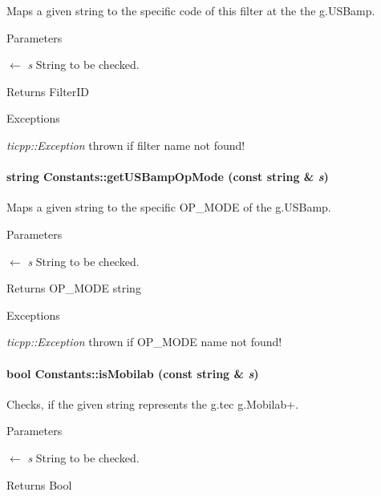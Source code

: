 Maps a given string to the specific code of this filter at the the g.USBamp. 
\begin{DoxyParams}{Parameters}
\item[\mbox{$\leftarrow$} {\em s}]String to be checked. \end{DoxyParams}
\begin{DoxyReturn}{Returns}
FilterID 
\end{DoxyReturn}

\begin{DoxyExceptions}{Exceptions}
\item[{\em ticpp::Exception}]thrown if filter name not found! \end{DoxyExceptions}
\hypertarget{class_constants_a33789e205b2169ce7787859db523b0d2}{
\paragraph[{getUSBampOpMode}]{\setlength{\rightskip}{0pt plus 5cm}string Constants::getUSBampOpMode (const string \& {\em s})}\hfill}
\label{class_constants_a33789e205b2169ce7787859db523b0d2}


Maps a given string to the specific OP\_\-MODE of the g.USBamp. 
\begin{DoxyParams}{Parameters}
\item[\mbox{$\leftarrow$} {\em s}]String to be checked. \end{DoxyParams}
\begin{DoxyReturn}{Returns}
OP\_\-MODE string 
\end{DoxyReturn}

\begin{DoxyExceptions}{Exceptions}
\item[{\em ticpp::Exception}]thrown if OP\_\-MODE name not found! \end{DoxyExceptions}
\hypertarget{class_constants_ac68da3efa9f4431daedf508f0577049e}{
\paragraph[{isMobilab}]{\setlength{\rightskip}{0pt plus 5cm}bool Constants::isMobilab (const string \& {\em s})}\hfill}
\label{class_constants_ac68da3efa9f4431daedf508f0577049e}


Checks, if the given string represents the g.tec g.Mobilab+. 
\begin{DoxyParams}{Parameters}
\item[\mbox{$\leftarrow$} {\em s}]String to be checked. \end{DoxyParams}
\begin{DoxyReturn}{Returns}
Bool 
\end{DoxyReturn}


